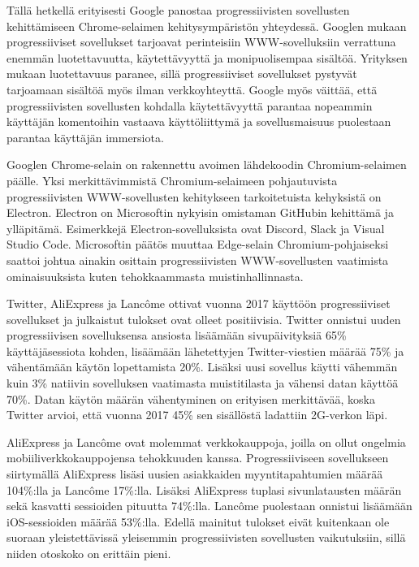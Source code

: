 \documentclass[utf8]{gradu3}
\begin{document}
Tällä hetkellä erityisesti Google panostaa progressiivisten sovellusten kehittämiseen Chrome-selaimen kehitysympäristön yhteydessä. Googlen \parencite[]{google-pwa-marketing} mukaan progressiiviset sovellukset tarjoavat perinteisiin WWW-sovelluksiin verrattuna enemmän luotettavuutta, käytettävyyttä ja monipuolisempaa sisältöä. Yrityksen mukaan luotettavuus paranee, sillä progressiiviset sovellukset pystyvät tarjoamaan sisältöä myös ilman verkkoyhteyttä. Google myös väittää, että progressiivisten sovellusten kohdalla käytettävyyttä parantaa nopeammin käyttäjän komentoihin vastaava käyttöliittymä ja sovellusmaisuus puolestaan parantaa käyttäjän immersiota.

Googlen Chrome-selain on rakennettu avoimen lähdekoodin Chromium-selaimen päälle. Yksi merkittävimmistä Chromium-selaimeen pohjautuvista progressiivisten WWW-sovellusten kehitykseen tarkoitetuista kehyksistä on Electron. Electron on Microsoftin nykyisin omistaman GitHubin kehittämä ja ylläpitämä. Esimerkkejä Electron-sovelluksista ovat Discord, Slack ja Visual Studio Code. Microsoftin päätös muuttaa Edge-selain Chromium-pohjaiseksi saattoi johtua ainakin osittain progressiivisten WWW-sovellusten vaatimista ominaisuuksista kuten tehokkaammasta muistinhallinnasta.

Twitter, AliExpress ja Lancôme ottivat vuonna 2017 käyttöön progressiiviset sovellukset ja julkaistut tulokset ovat olleet positiivisia. Twitter onnistui uuden progressiivisen sovelluksensa ansiosta lisäämään sivupäivityksiä 65\% käyttäjäsessiota kohden, lisäämään lähetettyjen Twitter-viestien määrää 75\% ja vähentämään käytön lopettamista 20\%. Lisäksi uusi sovellus käytti vähemmän kuin 3\% natiivin sovelluksen vaatimasta muistitilasta ja vähensi datan käyttöä 70\%. Datan käytön määrän vähentyminen on erityisen merkittävää, koska Twitter arvioi, että vuonna 2017 45\% sen sisällöstä ladattiin 2G-verkon läpi. \parencite[]{beginners-guide-pwa}

AliExpress ja Lancôme ovat molemmat verkkokauppoja, joilla on ollut ongelmia mobiiliverkkokauppojensa tehokkuuden kanssa. Progressiiviseen sovellukseen siirtymällä AliExpress lisäsi uusien asiakkaiden myyntitapahtumien määrää 104\%:lla ja Lancôme 17\%:lla. Lisäksi AliExpress tuplasi sivunlatausten määrän sekä kasvatti sessioiden pituutta 74\%:lla. Lancôme puolestaan onnistui lisäämään iOS-sessioiden määrää 53\%:lla. Edellä mainitut tulokset eivät kuitenkaan ole suoraan yleistettävissä yleisemmin progressiivisten sovellusten vaikutuksiin, sillä niiden otoskoko on erittäin pieni. \parencite[]{beginners-guide-pwa}
\end{document}
